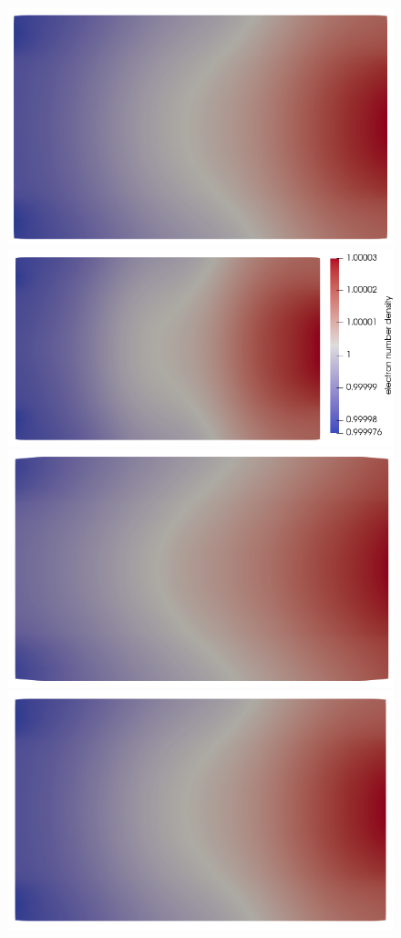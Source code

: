 \documentclass{article}
\begin{document}
\begin{figure}
    \includegraphics[scale=0.27]{slice_ne_T-1_lambda-0_16-3-3.png}
    \includegraphics[scale=0.27]{slice_ne_T-1_lambda-0_32-3-4.png}
    \includegraphics[scale=0.27]{slice_ni_T-1_lambda-0_8-2-2.png}
    \includegraphics[scale=0.27]{slice_ni_T-1_lambda-0_16-3-3.png}

\end{figure}
\end{document}
